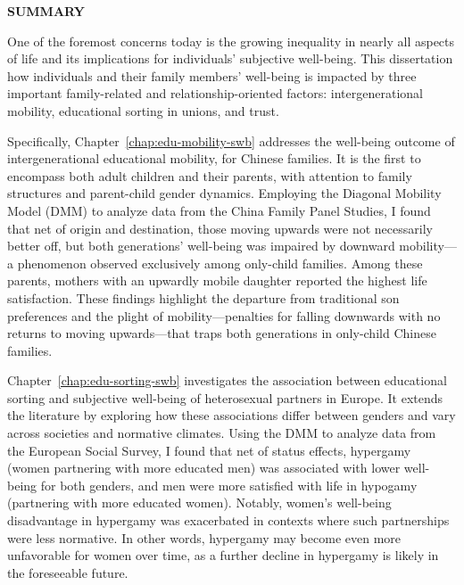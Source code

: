 \begin{center}
    {\large \textbf{SUMMARY}}
\end{center}

\thispagestyle{plain}

One of the foremost concerns today is the growing inequality in nearly all aspects of life and its implications for individuals' subjective well-being. This dissertation how individuals and their family members' well-being is impacted by three important family-related and relationship-oriented factors: intergenerational mobility, educational sorting in unions, and trust.

Specifically, Chapter~\ref{chap:edu-mobility-swb} addresses the well-being outcome of intergenerational educational mobility, for Chinese families. It is the first to encompass both adult children and their parents, with attention to family structures and parent-child gender dynamics. Employing the Diagonal Mobility Model (DMM) to analyze data from the China Family Panel Studies, I found that net of origin and destination, those moving upwards were not necessarily better off, but both generations' well-being was impaired by downward mobility—a phenomenon observed exclusively among only-child families. Among these parents, mothers with an upwardly mobile daughter reported the highest life satisfaction. These findings highlight the departure from traditional son preferences and the plight of mobility—penalties for falling downwards with no returns to moving upwards—that traps both generations in only-child Chinese families.

Chapter~\ref{chap:edu-sorting-swb} investigates the association between educational sorting and subjective well-being of heterosexual partners in Europe. It extends the literature by exploring how these associations differ between genders and vary across societies and normative climates. Using the DMM to analyze data from the European Social Survey, I found that net of status effects, hypergamy (women partnering with more educated men) was associated with lower well-being for both genders, and men were more satisfied with life in hypogamy (partnering with more educated women). Notably, women's well-being disadvantage in hypergamy was exacerbated in contexts where such partnerships were less normative. In other words, hypergamy may become even more unfavorable for women over time, as a further decline in hypergamy is likely in the foreseeable future.

